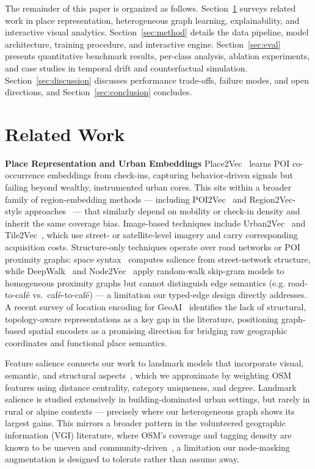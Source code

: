 \documentclass[]{interact}
\theoremstyle{plain}%
\theoremstyle{definition}
\theoremstyle{remark}
\begin{document}
The remainder of this paper is organized as follows. Section~\ref{sec:related} surveys related work in place representation, heterogeneous graph learning, explainability, and interactive visual analytics. Section~\ref{sec:method} details the data pipeline, model architecture, training procedure, and interactive engine. Section~\ref{sec:eval} presents quantitative benchmark results, per-class analysis, ablation experiments, and case studies in temporal drift and counterfactual simulation. Section~\ref{sec:discussion} discusses performance trade-offs, failure modes, and open directions, and Section~\ref{sec:conclusion} concludes.

\section{Related Work} \label{sec:related}

\textbf{Place Representation and Urban Embeddings}
Place2Vec~\citep{place2vec} learns POI co-occurrence embeddings from check-ins, capturing behavior-driven signals but failing beyond wealthy, instrumented urban cores. This sits within a broader family of region-embedding methods --- including POI2Vec~\citep{3298239.3298256} and Region2Vec-style approaches~\citep{luo2022urbanregionprofilingmultigraph} --- that similarly depend on mobility or check-in density and inherit the same coverage bias. Image-based techniques include Urban2Vec~\citep{urban2vec} and Tile2Vec~\citep{tile2vec}, which use street- or satellite-level imagery and carry corresponding acquisition costs. Structure-only techniques operate over road networks or POI proximity graphs: space syntax~\citep{hillier1984social} computes salience from street-network structure, while DeepWalk~\citep{Perozzi_2014} and Node2Vec~\citep{grover2016node2vecscalablefeaturelearning} apply random-walk skip-gram models to homogeneous proximity graphs but cannot distinguish edge semantics (e.g. road-to-caf\'e vs.\ caf\'e-to-caf\'e) --- a limitation our typed-edge design directly addresses. A recent survey of location encoding for GeoAI~\citep{mai2022review} identifies the lack of structural, topology-aware representations as a key gap in the literature, positioning graph-based spatial encoders as a promising direction for bridging raw geographic coordinates and functional place semantics.

Feature salience connects our work to landmark models that incorporate visual, semantic, and structural aspects~\citep{Caduff, 10.1007/3-540-45799-2_17}, which we approximate by weighting OSM features using distance centrality, category uniqueness, and degree. Landmark salience is studied extensively in building-dominated urban settings, but rarely in rural or alpine contexts --- precisely where our heterogeneous graph shows its largest gains. This mirrors a broader pattern in the volunteered geographic information (VGI) literature, where OSM's coverage and tagging density are known to be uneven and community-driven~\citep{haklay2010good, goodchild2007citizens, Fonte-2017}, a limitation our node-masking augmentation is designed to tolerate rather than assume away.
\end{document}
